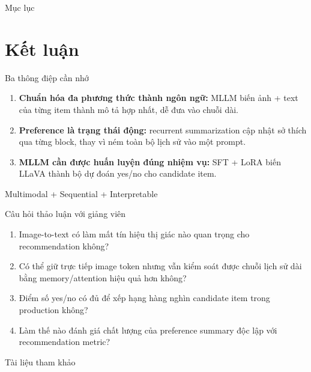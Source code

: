 \documentclass[aspectratio=169]{beamer}
\begin{document}
\begin{frame}\titlepage\end{frame}
\begin{frame}{Mục lục}\setcounter{tocdepth}{2}\tableofcontents\end{frame}












\section{Kết luận}
\begin{frame}{Ba thông điệp cần nhớ}
  \begin{enumerate}
    \item \textbf{Chuẩn hóa đa phương thức thành ngôn ngữ:} MLLM biến ảnh + text của từng item thành mô tả hợp nhất, dễ đưa vào chuỗi dài.
    \item \textbf{Preference là trạng thái động:} recurrent summarization cập nhật sở thích qua từng block, thay vì ném toàn bộ lịch sử vào một prompt.
    \item \textbf{MLLM cần được huấn luyện đúng nhiệm vụ:} SFT + LoRA biến LLaVA thành bộ dự đoán yes/no cho candidate item.
  \end{enumerate}
  \vspace{0.3cm}\centering\Large\textcolor{Logo1}{Multimodal + Sequential + Interpretable}
\end{frame}
\begin{frame}{Câu hỏi thảo luận với giảng viên}
  \begin{enumerate}
    \item Image-to-text có làm mất tín hiệu thị giác nào quan trọng cho recommendation không?
    \item Có thể giữ trực tiếp image token nhưng vẫn kiểm soát được chuỗi lịch sử dài bằng memory/attention hiệu quả hơn không?
    \item Điểm số yes/no có đủ để xếp hạng hàng nghìn candidate item trong production không?
    \item Làm thế nào đánh giá chất lượng của preference summary độc lập với recommendation metric?
  \end{enumerate}
\end{frame}
\begin{frame}[allowframebreaks]{Tài liệu tham khảo}\tiny\end{frame}
\end{document}
